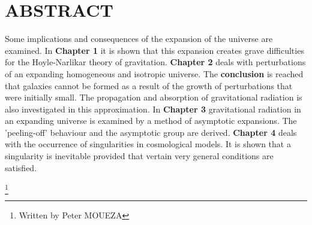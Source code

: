 \documentclass{article}
\date{1st february 1966}
\begin{document}



\part{\textbf{ABSTRACT}}


Some implications and consequences of the expansion of the universe are examined. In \textbf{Chapter 1} it is shown that this expansion creates grave difficulties for the Hoyle-Narlikar theory of gravitation. \textbf{Chapter 2} deals with perturbations of an expanding homogeneous and isotropic universe. The \textbf{conclusion} is reached that galaxies cannot be formed as a result of the growth of perturbations that were initially small. The propagation and absorption of gravitational radiation is also investigated in this approximation. In  \textbf{Chapter 3} gravitational radiation in an expanding universe is examined by a method of asymptotic expansions. The 'peeling-off' behaviour and the asymptotic group are derived.  \textbf{Chapter 4} deals with the occurrence of singularities in cosmological models. It is shown that a singularity is inevitable provided that vertain very general conditions are satisfied.








\footnote{Written by Peter MOUEZA}
\end{document}
